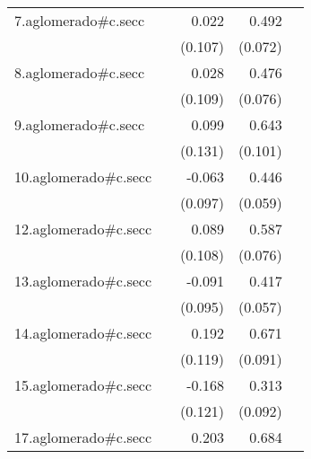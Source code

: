 {\begin{longtable}{l*{4}{D{.}{.}{-1}}}
\addlinespace
7.aglomerado#c.secc&                     &       0.022         &       0.492\sym{***}&                     \\
            &                     &     (0.107)         &     (0.072)         &                     \\
\addlinespace
8.aglomerado#c.secc&                     &       0.028         &       0.476\sym{***}&                     \\
            &                     &     (0.109)         &     (0.076)         &                     \\
\addlinespace
9.aglomerado#c.secc&                     &       0.099         &       0.643\sym{***}&                     \\
            &                     &     (0.131)         &     (0.101)         &                     \\
\addlinespace
10.aglomerado#c.secc&                     &      -0.063         &       0.446\sym{***}&                     \\
            &                     &     (0.097)         &     (0.059)         &                     \\
\addlinespace
12.aglomerado#c.secc&                     &       0.089         &       0.587\sym{***}&                     \\
            &                     &     (0.108)         &     (0.076)         &                     \\
\addlinespace
13.aglomerado#c.secc&                     &      -0.091         &       0.417\sym{***}&                     \\
            &                     &     (0.095)         &     (0.057)         &                     \\
\addlinespace
14.aglomerado#c.secc&                     &       0.192         &       0.671\sym{***}&                     \\
            &                     &     (0.119)         &     (0.091)         &                     \\
\addlinespace
15.aglomerado#c.secc&                     &      -0.168         &       0.313\sym{***}&                     \\
            &                     &     (0.121)         &     (0.092)         &                     \\
\addlinespace
17.aglomerado#c.secc&                     &       0.203         &       0.684\sym{***}&                     \\

\end{longtable}}
